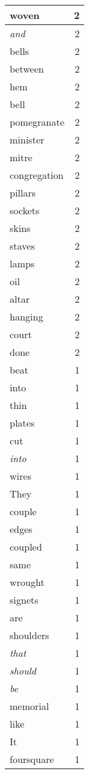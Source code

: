 \begin{center}
\begin{longtable}{l|r}
woven & 2 \\ \hline
\emph{and} & 2 \\ \hline
bells & 2 \\ \hline
between & 2 \\ \hline
hem & 2 \\ \hline
bell & 2 \\ \hline
pomegranate & 2 \\ \hline
minister & 2 \\ \hline
mitre & 2 \\ \hline
congregation & 2 \\ \hline
pillars & 2 \\ \hline
sockets & 2 \\ \hline
skins & 2 \\ \hline
staves & 2 \\ \hline
lamps & 2 \\ \hline
oil & 2 \\ \hline
altar & 2 \\ \hline
hanging & 2 \\ \hline
court & 2 \\ \hline
done & 2 \\ \hline
beat & 1 \\ \hline
into & 1 \\ \hline
thin & 1 \\ \hline
plates & 1 \\ \hline
cut & 1 \\ \hline
\emph{into} & 1 \\ \hline
wires & 1 \\ \hline
They & 1 \\ \hline
couple & 1 \\ \hline
edges & 1 \\ \hline
coupled & 1 \\ \hline
same & 1 \\ \hline
wrought & 1 \\ \hline
signets & 1 \\ \hline
are & 1 \\ \hline
shoulders & 1 \\ \hline
\emph{that} & 1 \\ \hline
\emph{should} & 1 \\ \hline
\emph{be} & 1 \\ \hline
memorial & 1 \\ \hline
like & 1 \\ \hline
It & 1 \\ \hline
foursquare & 1 \\ \hline

\end{longtable}
\end{center}
